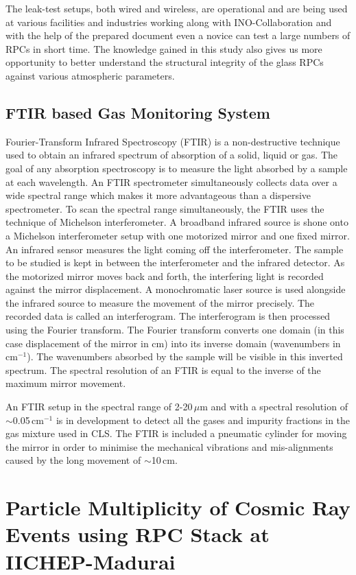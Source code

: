 The leak-test setups, both wired and wireless, are operational and are being used at various facilities and industries working along with INO-Collaboration and with the help of the prepared document even a novice can test a large numbers of RPCs in short time. The knowledge gained in this study also gives us more opportunity to better understand the structural integrity of the glass RPCs against various atmospheric parameters.

\subsection*{FTIR based Gas Monitoring System}
Fourier-Transform Infrared Spectroscopy (FTIR) is a non-destructive technique used to obtain an infrared spectrum of absorption of a solid, liquid or gas. The goal of any absorption spectroscopy is to measure the light absorbed by a sample at each wavelength. An FTIR spectrometer simultaneously collects data over a wide spectral range which makes it more advantageous than a dispersive spectrometer. To scan the spectral range simultaneously, the FTIR uses the technique of Michelson interferometer. A broadband infrared source is shone onto a Michelson interferometer setup with one motorized mirror and one fixed mirror. An infrared sensor measures the light coming off the interferometer. The sample to be studied is kept in between the interferometer and the infrared detector. As the motorized mirror moves back and forth, the interfering light is recorded against the mirror displacement. A monochromatic laser source is used alongside the infrared source to measure the movement of the mirror precisely. The recorded data is called an interferogram. The interferogram is then processed using the Fourier transform. The Fourier transform converts one domain (in this case displacement of the mirror in cm) into its inverse domain (wavenumbers in cm$^{-1}$). The wavenumbers absorbed by the sample will be visible in this inverted spectrum. The spectral resolution of an FTIR is equal to the inverse of the maximum mirror movement.

An FTIR setup in the spectral range of \mbox{2-20\,$\mu$m} and with a spectral resolution of \mbox{$\sim$0.05\,cm$^{-1}$} is in development to detect all the gases and impurity fractions in the gas mixture used in CLS. The FTIR is included a pneumatic cylinder for moving the mirror in order to minimise the mechanical vibrations and mis-alignments caused by the long movement of $\sim$10\,cm.

\section*{Particle Multiplicity of Cosmic Ray Events using RPC Stack at IICHEP-Madurai}

